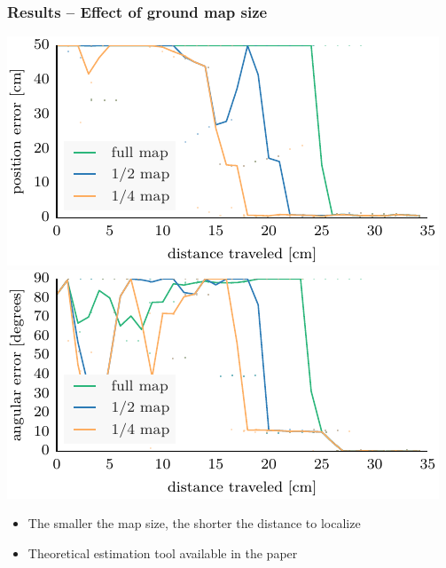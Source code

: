 \documentclass[lualatex,aspectratio=169,xcolor=dvipsnames,10pt,c]{beamer}
\begin{document}
\frame
{
	\frametitle{Results – Effect of ground map size}
	
	
	{\footnotesize
	\makebox[\textwidth][c]{\textcolor{gray}{varying ground map size}}
	}
	
	\includegraphics[width=.48\columnwidth]{ml-small_maps-xy}\hfill
	\includegraphics[width=.48\columnwidth]{ml-small_maps-theta}
	
	\vspace{1em}

	\begin{itemize}
	\item The smaller the map size, the shorter the distance to localize
	\item Theoretical estimation tool available in the paper
	\end{itemize}
}
\end{document}
